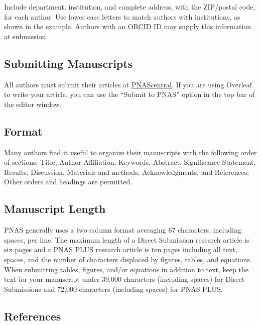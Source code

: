 \documentclass[9pt,twocolumn,twoside,]{pnas-new}
\begin{document}
Include department, institution, and complete address, with the
ZIP/postal code, for each author. Use lower case letters to match
authors with institutions, as shown in the example. Authors with an
ORCID ID may supply this information at submission.

\hypertarget{submitting-manuscripts}{%
\subsection*{Submitting Manuscripts}\label{submitting-manuscripts}}

All authors must submit their articles at
\href{http://www.pnascentral.org/cgi-bin/main.plex}{PNAScentral}. If you
are using Overleaf to write your article, you can use the ``Submit to
PNAS'' option in the top bar of the editor window.

\hypertarget{format}{%
\subsection*{Format}\label{format}}

Many authors find it useful to organize their manuscripts with the
following order of sections; Title, Author Affiliation, Keywords,
Abstract, Significance Statement, Results, Discussion, Materials and
methods, Acknowledgments, and References. Other orders and headings are
permitted.

\hypertarget{manuscript-length}{%
\subsection*{Manuscript Length}\label{manuscript-length}}

PNAS generally uses a two-column format averaging 67 characters,
including spaces, per line. The maximum length of a Direct Submission
research article is six pages and a PNAS PLUS research article is ten
pages including all text, spaces, and the number of characters displaced
by figures, tables, and equations. When submitting tables, figures,
and/or equations in addition to text, keep the text for your manuscript
under 39,000 characters (including spaces) for Direct Submissions and
72,000 characters (including spaces) for PNAS PLUS.

\hypertarget{references}{%
\subsection*{References}\label{references}}
\end{document}
